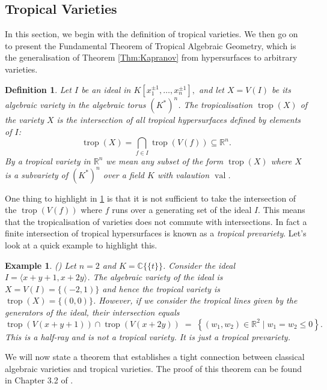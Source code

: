 \documentclass[11pt,reqno,a4paper]{article}
\theoremstyle{theoremstyle}
\theoremstyle{examplestyle}
\newtheorem{example}[theorem]{Example}
\newtheorem{definition}[theorem]{Definition}
\theoremstyle{algorithmstyle}
\numberwithin{equation}{subsection}
\newcommand{\RR}{\mathbb{R}}
\newcommand{\puiseux}{\mathbb{C}\{\{t\}\}}
\DeclareMathOperator{\trop}{trop}
\DeclareMathOperator{\val}{val}
\begin{document}
 
\subsection{Tropical Varieties}
In this section, we begin with the definition of tropical varieties. We then go on to present the Fundamental Theorem of Tropical Algebraic Geometry, which is the generalisation of Theorem \ref{Thm:Kapranov} from hypersurfaces to arbitrary varieties.

\begin{definition} \label{def:variety}
    Let $I$ be an ideal in $K[x_1^{\pm1},\ldots,x_n^{\pm1}],$ and let $X = V(I)$ be its algebraic variety in the algebraic torus $(K^*)^n$. The \textit{tropicalisation} $\trop(X)$ of the variety $X$ is the intersection of all tropical hypersurfaces defined by elements of $I$:
    \begin{equation}
    \label{eqn:variety}
        \trop(X) = \bigcap_{f\in I}\trop(V(f)) \subseteq \RR^n.
    \end{equation}
    By a \textit{tropical variety} in $\RR^n$ we mean any subset of the form $\trop(X)$ where $X$ is a subvariety of $(K^*)^n$ over a field $K$ with valaution $\val$.
\end{definition}

One thing to highlight in \ref{def:variety} is that it is not sufficient to take the intersection of the $\trop(V(f))$ where $f$ runs over a generating set of the ideal $I$. This means that the tropicalisation of varieties does not commute with intersections. In fact a finite intersection of tropical hypersurfaces is known as a \textit{tropical prevariety}. Let's look at a quick example to highlight this.

\begin{example}
    (\cite[Ex. 3.2.2]{MS2015}) Let $n=2$ and $K = \puiseux$. Consider the ideal $I = \langle x+y+1, x+2y\rangle$. The algebraic variety of the ideal is $X = V(I) = \{(-2,1)\}$ and hence the tropical variety is $\trop(X) = \{(0,0)\}$. However, if we consider the tropical lines given by the generators of the ideal, their intersection equals \[\trop(V(x+y+1)) \cap \trop(V(x+2y)) \; =  \; \left\{ (w_1,w_2) \in \RR^2 \; | \; w_1 = w_2 \leq 0 \right\}. \] This is a half-ray and is not a tropical variety. It is just a tropical prevariety.
\end{example}

We will now state a theorem that establishes a tight connection between classical algebraic varieties and tropical varieties. The proof of this theorem can be found in Chapter 3.2 of \cite{MS2015}.
\end{document}
